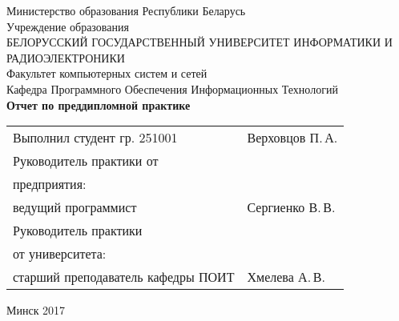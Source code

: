 \begin{titlepage}
    
    \begin{center}
        Министерство образования Республики Беларусь \\[0.4cm] 

        Учреждение образования \\

        \MakeUppercase{БЕЛОРУССКИЙ ГОСУДАРСТВЕННЫЙ УНИВЕРСИТЕТ ИНФОРМАТИКИ И РАДИОЭЛЕКТРОНИКИ} \\[0.4cm]

        Факультет компьютерных систем и сетей \\[0.4cm]

        Кафедра Программного Обеспечения Информационных Технологий \\[3.4cm] %

        {\large\bfseries{Отчет по преддипломной практике}} \\[2cm]
        \begin{tabular}{p{}p{} }
            Выполнил студент гр. 251001
            & Верховцов П.\,А. \\[1cm]

            Руководитель практики от \\
            предприятия: \\
            ведущий программист
            & Сергиенко В.\,В. \\[1cm]

            Руководитель практики \\
            от университета: \\
            старший преподаватель кафедры ПОИТ
            & Хмелева А.\,В. \\
        \end{tabular}

       \vfill

        {\normalsize Минск 2017}
    \end{center}

\end{titlepage}